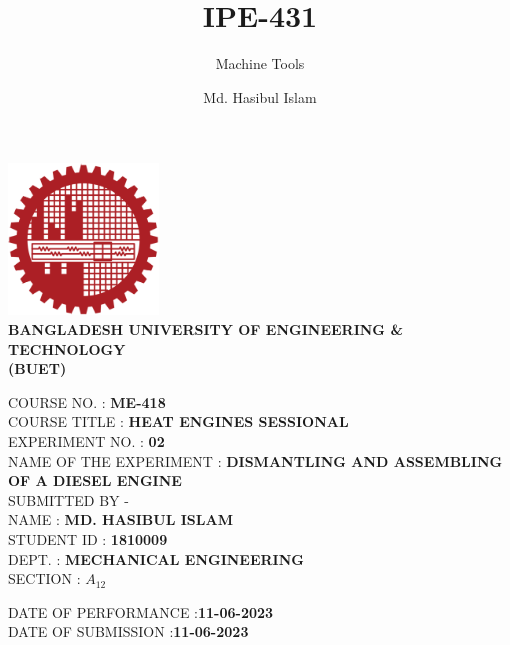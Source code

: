\documentclass[14pt]{article}
\title{IPE-431}
\author{Md. Hasibul Islam}
\subtitle{Machine Tools}
\date{}
\begin{document}
\begin{titlepage}
    \centering
    \includegraphics[width=4cm]{institution_logo.jpg}\\
    \vspace*{1cm}
    \textbf{\MakeTextUppercase{Bangladesh University of Engineering \& Technology}} \\

    \textbf{\MakeTextUppercase{(BUET)}} \\
    \vspace*{2cm}
    \raggedright
    \MakeTextUppercase{Course No.} : \textbf{ME-418}\\
    \vspace*{0.5cm}
    \MakeTextUppercase{Course Title} : \textbf{HEAT ENGINES SESSIONAL} \\ 
    \vspace*{1cm}
    \MakeTextUppercase{Experiment No.} : \textbf{02} \\
    \vspace*{0.5cm}
    \MakeTextUppercase{Name of the Experiment} :  \textbf{DISMANTLING AND ASSEMBLING OF A DIESEL ENGINE} \\
    \vspace*{3.5cm} 
    \MakeTextUppercase{Submitted By -} \\
    \vspace*{0.5cm}
    \MakeTextUppercase{Name}        : \hspace{2cm}\textbf{MD. HASIBUL ISLAM} \\
    \vspace*{0.5cm}
    \MakeTextUppercase{Student id}  : \hspace{1cm}\textbf{1810009} \\
    \vspace*{0.5cm}
    \MakeTextUppercase{Dept.}       : \hspace{2cm}\textbf{MECHANICAL ENGINEERING} \\
    \vspace*{0.5cm}
    \MakeTextUppercase{section}     : \hspace{1.5cm}\textbf{$A_{12}$} \\

    \vspace*{2cm}

    \MakeTextUppercase{Date of Performance}     :\hspace{1.5cm}\textbf{11-06-2023}\\
    \vspace*{0.5cm}
    \MakeTextUppercase{Date of Submission}      :\hspace{2cm}\textbf{11-06-2023}\\

    \vfill
\end{titlepage}
\end{document}
